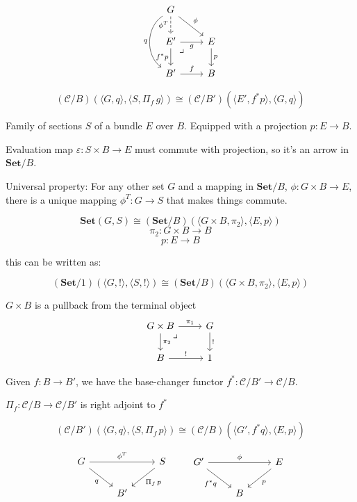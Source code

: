 \documentclass[DaoFP]{subfiles}
\begin{document}
\[
 \begin{tikzcd}
 G
 \arrow[d, dashed, "\phi^T"']
 \arrow[dr, "\phi"]
 \arrow[dd, bend right=55, "q"']
 \\
 E'
 \arrow[dr, phantom,  , very near start, "\lrcorner"]
\arrow[d, "f^* p"']
 \arrow[r, "g"']
 & E
 \arrow[d, "p"]
 \\
 B'
 \arrow[r, "f"]
 &
 B
  \end{tikzcd}
\]

\[(\mathcal{C}/B)(\langle G, q \rangle, \langle S, \Pi_f \,g\rangle) \cong (\mathcal{C}/B') (\langle E', f^* p\rangle, \langle G, q \rangle) \]


Family of sections $S$ of a bundle $E$ over $B$. Equipped with a projection $p \colon E \to B$.

Evaluation map $\varepsilon \colon S \times B \to E$ must commute with projection, so it's an arrow in $\mathbf{Set}/B$.

Universal property: For any other set $G$ and a mapping in $\mathbf{Set}/B$,  $\phi \colon G \times B \to E$, there is a unique mapping $\phi^T \colon G \to S$ that makes things commute.

\[\mathbf{Set} (G, S) \cong (\mathbf{Set}/B)(\langle G\times B, \pi_2\rangle , \langle E, p\rangle ) \]
\[\pi_2 \colon G \times B \to B \]
\[p \colon E \to B \]

this can be written as:

\[(\mathbf{Set}/1) (\langle G, !\rangle , \langle S, !\rangle ) \cong (\mathbf{Set}/B)(\langle G\times B, \pi_2\rangle , \langle E, p\rangle )  \]

$G \times B$ is a pullback from the terminal object
\[
 \begin{tikzcd}
 G \times B
 \arrow[dr, phantom,  , very near start, "\lrcorner"]
\arrow[d, "\pi_2"]
 \arrow[r, "\pi_1"]
 & G
 \arrow[d, "!"]
 \\
 B
 \arrow[r, "!"]
 &
 1
  \end{tikzcd}
\]

Given $f \colon B \to B'$, we have the base-changer functor $f^* \colon \mathcal{C}/B' \to \mathcal{C}/B$.

$\Pi_f \colon \mathcal{C}/B \to \mathcal{C}/B'$ is right adjoint to $f^*$

\[(\mathcal{C}/B')(\langle G, q \rangle, \langle S, \Pi_f \,p\rangle) \cong (\mathcal{C}/B) (\langle G', f^* q\rangle, \langle E, p \rangle) \]

\[
\begin{tikzcd}
 G
 \arrow[rr, "\phi^T"]
 \arrow[rd, "q"']
 && S
 \arrow[ld, "\Pi_f \, p"]
 \\
 & B'
  \end{tikzcd}
 \hspace{20pt}
 \begin{tikzcd}
 G'
 \arrow[rr, "\phi"]
 \arrow[rd, "f^* q"']
 &&E
 \arrow[dl, "p"]
 \\
 &B
  \end{tikzcd}
\]
\end{document}
